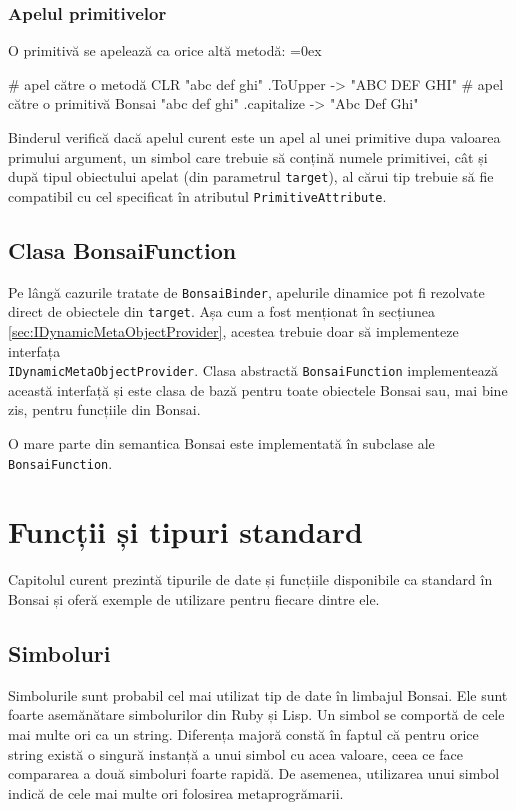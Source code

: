 \documentclass[12pt,a4paper]{memoir}
\renewcommand{\c}{\texttt}
\newenvironment{code}
{
\definecolor{shadecolor}{gray}{0.91}
\topsep=0ex
\relax
\shaded
\verbatim
}
{
\endverbatim
\endshaded
}
\begin{document}
\subsection{Apelul primitivelor}

O primitivă se apelează ca orice altă metodă:
\begin{code}
# apel către o metodă CLR
"abc def ghi" .ToUpper
  -> "ABC DEF GHI"
# apel către o primitivă Bonsai
"abc def ghi" .capitalize
  -> "Abc Def Ghi"
\end{code}

Binderul verifică dacă apelul curent este un apel al unei primitive dupa valoarea primului argument, un simbol care trebuie să conțină numele primitivei, cât și după tipul obiectului apelat (din parametrul \c{target}), al cărui tip trebuie să fie compatibil cu cel specificat în atributul \c{PrimitiveAttribute}.

\section{Clasa BonsaiFunction}

Pe lângă cazurile tratate de \c{BonsaiBinder}, apelurile dinamice pot fi rezolvate direct de obiectele din \c{target}. Așa cum a fost menționat în secțiunea \ref{sec:IDynamicMetaObjectProvider}, acestea trebuie doar să implementeze interfața\\ \c{IDynamicMetaObjectProvider}. Clasa abstractă \c{BonsaiFunction} implementează această interfață și este clasa de bază pentru toate obiectele Bonsai sau, mai bine zis, pentru funcțiile din Bonsai.

O mare parte din semantica Bonsai este implementată în subclase ale \c{BonsaiFunction}. 

\chapter{Funcții și tipuri standard}

Capitolul curent prezintă tipurile de date și funcțiile disponibile ca standard în Bonsai și oferă exemple de utilizare pentru fiecare dintre ele.

\section{Simboluri}

Simbolurile sunt probabil cel mai utilizat tip de date în limbajul Bonsai. Ele sunt foarte asemănătare simbolurilor din Ruby\cite{ruby_symbols} și Lisp\cite{clhs_symbols}. Un simbol se comportă de cele mai multe ori ca un string. Diferența majoră constă în faptul că pentru orice string există o singură instanță a unui simbol cu acea valoare, ceea ce face compararea a două simboluri foarte rapidă. De asemenea, utilizarea unui simbol indică de cele mai multe ori folosirea metaprogrămarii.
\end{document}
